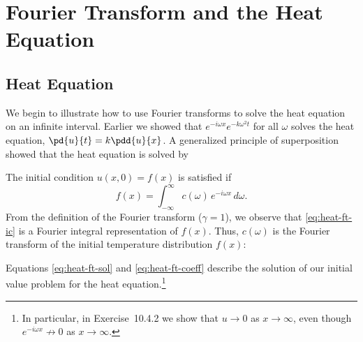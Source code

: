 \section{Fourier Transform and the Heat Equation}
\label{sec:ft-heat}

\subsection{Heat Equation}
\label{subsec:ft-heat-eq}

We begin to illustrate how to use Fourier transforms to solve the heat equation on an infinite interval.  Earlier we showed that $e^{-i\omega x}e^{-k\omega^2 t}$ for all $\omega$ solves the heat equation, $\pd{u}{t} = k\pdd{u}{x}$.  A generalized principle of superposition showed that the heat equation is solved by

The initial condition $u(x,0) = f(x)$ is satisfied if
\begin{equation}
\label{eq:heat-ft-ic}
f(x) = \int_{-\infty}^{\infty} c(\omega)\,e^{-i\omega x}\,d\omega.
\end{equation}
From the definition of the Fourier transform ($\gamma = 1$), we observe that \eqref{eq:heat-ft-ic} is a Fourier integral representation of $f(x)$.  Thus, $c(\omega)$ is the Fourier transform of the initial temperature distribution $f(x)$:

Equations \eqref{eq:heat-ft-sol} and \eqref{eq:heat-ft-coeff} describe the solution of our initial value problem for the heat equation.\footnote{In particular, in Exercise~10.4.2 we show that $u \to 0$ as $x \to \infty$, even though $e^{-i\omega x} \not\to 0$ as $x \to \infty$.}

